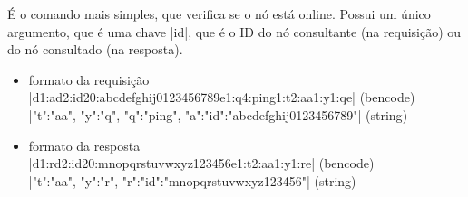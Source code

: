 
{}

É o comando mais simples, que verifica se o nó está online. Possui um único argumento,
que é uma chave \bverb|id|, que é o ID do nó consultante (na requisição) ou do nó
consultado (na resposta).

\begin{itemize}
    \item formato da requisição \\
        \bverb|d1:ad2:id20:abcdefghij0123456789e1:q4:ping1:t2:aa1:y1:qe|
        (\gls*{bencode}) \\
        \sverb|{"t":"aa", "y":"q", "q":"ping", "a":{"id":"abcdefghij0123456789"}}|
        (\gls*{string})

    \item formato da resposta \\
        \bverb|d1:rd2:id20:mnopqrstuvwxyz123456e1:t2:aa1:y1:re|
        (\gls*{bencode}) \\
        \sverb|{"t":"aa", "y":"r", "r":{"id":"mnopqrstuvwxyz123456"}}|
        (\gls*{string})
\end{itemize}

